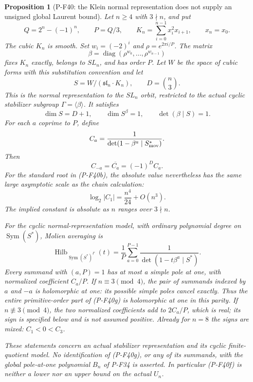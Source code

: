 \documentclass[11pt,a4paper]{article}
\newtheorem{proposition}{Proposition}[section]
\begin{document}
\begin{proposition}[P-F40: the Klein normal representation does not supply an unsigned global Laurent bound]
\label{prop:kleinphase}
Let $n\ge4$ with $3\nmid n$, and put
\[
 Q=2^n-(-1)^n,\qquad P=Q/3,\qquad
 K_n=\sum_{i=0}^{n-1}x_i^2x_{i+1},\qquad x_n=x_0.
 \tag{P-F40a}
\]
The cubic $K_n$ is smooth. Set $w_i=(-2)^i$ and
$\rho=e^{2\pi i/P}$. The matrix
\[
 \beta=\operatorname{diag}(\rho^{w_0},\ldots,\rho^{w_{n-1}})
 \tag{P-F40b}
\]
fixes $K_n$ exactly, belongs to $SL_n$, and has order $P$.
Let $W$ be the space of cubic forms with this substitution
convention and let
\[
 S=W/(\mathfrak{sl}_n\cdot K_n),\qquad D=\binom n3.
 \tag{P-F40c}
\]
This is the normal representation to the $SL_n$ orbit, restricted
to the actual cyclic stabilizer subgroup $\Gamma=\langle\beta\rangle$.
It satisfies
\[
 \dim S=D+1,\qquad\dim S^\beta=1,\qquad
 \det(\beta\mid S)=1.
 \tag{P-F40d}
\]
For each $a$ coprime to $P$, define
\[
 C_a=\frac1{\det(1-\beta^a\mid S^*_{\rm mov})}.
\]
Then
\[
                 C_{-a}=\overline{C_a}=(-1)^D C_a.
 \tag{P-F40e}
\]
For the standard root in (P-F40b), the absolute value nevertheless
has the same large asymptotic scale as the chain calculation:
\[
                         \log_2|C_1|=\frac{n^4}{24}+O(n^3).
 \tag{P-F40f}
\]
The implied constant is absolute as $n$ ranges over $3\nmid n$.

For the cyclic normal-representation model, with ordinary
polynomial degree on $\operatorname{Sym}(S^*)$, Molien averaging is
\[
 \operatorname{Hilb}_{\operatorname{Sym}(S^*)^\Gamma}(t)
       =\frac1P\sum_{a=0}^{P-1}
                       \frac1{\det(1-t\beta^a\mid S^*)}.
 \tag{P-F40g}
\]
Every summand with $(a,P)=1$ has at most a simple pole at one,
with normalized coefficient $C_a/P$.
If $n\equiv3\pmod4$, the pair of summands indexed by $a$ and
$-a$ is holomorphic at one: its possible simple poles cancel
exactly. Thus the entire primitive-order part of (P-F40g)
is holomorphic at one in this parity. If $n\not\equiv3\pmod4$,
the two normalized coefficients add to $2C_a/P$, which is real;
its sign is specified below and is not assumed positive.
Already for $n=8$ the signs are mixed: $C_1<0<C_3$.

These statements concern an actual stabilizer representation
and its cyclic finite-quotient model. No identification of
(P-F40g), or any of its summands, with the global pole-at-one
polynomial $B_n$ of P-F34 is asserted. In particular (P-F40f)
is neither a lower nor an upper bound on the actual $U_n$.
\end{proposition}
\end{document}
